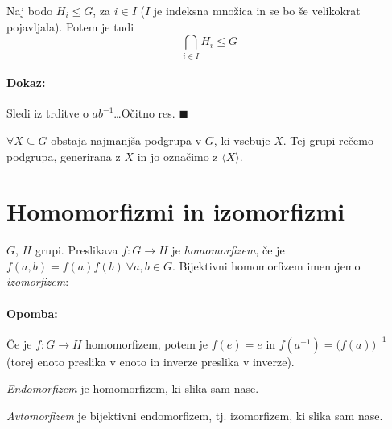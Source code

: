 \begin{trditev}
	Naj bodo $H_i \leq G$, za $i \in I$ ($I$ je indeksna mno\v zica in se bo \v se velikokrat pojavljala). Potem je tudi
	\[
		\bigcap_{i\in I} H_i \leq G
	\]
\end{trditev}

\paragraph{Dokaz:} Sledi iz trditve o $ab^{-1}$\ldots O\v citno res. $\blacksquare$

\begin{posledica}
	$\forall X \subseteq G$ obstaja najmanj\v sa podgrupa v $G$, ki vsebuje $X$. Tej grupi re\v cemo podgrupa, generirana z $X$ in jo ozna\v cimo z $\langle X \rangle$.
\end{posledica}

\section{Homomorfizmi in izomorfizmi}

\begin{defin}
$G$, $H$ grupi. Preslikava $f : G \to H$ je \emph{homomorfizem}, \v ce je $f(a,b) = f(a) f(b)\ \forall a,b \in G$. Bijektivni homomorfizem imenujemo \emph{izomorfizem}:

\paragraph{Opomba:} \v Ce je $f : G \to H$ homomorfizem, potem je $f(e) = e$ in $f(a^{-1}) = \big(f(a)\big)^{-1}$ (torej enoto preslika v enoto in inverze preslika v inverze).
\end{defin}

\begin{defin}
	\emph{Endomorfizem} je homomorfizem, ki slika sam nase.

	\ni \emph{Avtomorfizem} je bijektivni endomorfizem, tj. izomorfizem, ki slika sam nase.
\end{defin}

